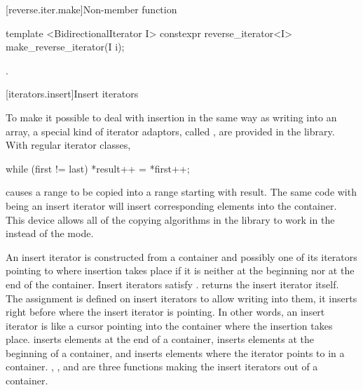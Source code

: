 [reverse.iter.make]{Non-member function }

%
\begin{itemdecl}
template <BidirectionalIterator I>
  constexpr reverse_iterator<I> make_reverse_iterator(I i);
\end{itemdecl}

\begin{itemdescr}
\pnum
\returns
{}.
\end{itemdescr}

[iterators.insert]{Insert iterators}

\pnum
To make it possible to deal with insertion in the same way as writing into an array, a special kind of iterator
adaptors, called
,
are provided in the library.
With regular iterator classes,

\begin{codeblock}
while (first != last) *result++ = *first++;
\end{codeblock}

causes a range 
to be copied into a range starting with result.
The same code with
being an insert iterator will insert corresponding elements into the container.
This device allows all of the
copying algorithms in the library to work in the
instead of the  mode.

\pnum
An insert iterator is constructed from a container and possibly one of its iterators pointing to where
insertion takes place if it is neither at the beginning nor at the end of the container.
Insert iterators satisfy .
returns the insert iterator itself.
The assignment
is defined on insert iterators to allow writing into them, it inserts
right before where the insert iterator is pointing.
In other words, an insert iterator is like a cursor pointing into the
container where the insertion takes place.
inserts elements at the end of a container,
inserts elements at the beginning of a container, and
inserts elements where the iterator points to in a container.
,
,
and
are three
functions making the insert iterators out of a container.

